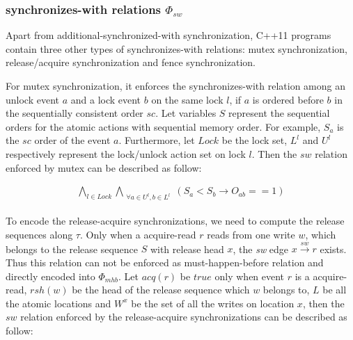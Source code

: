 \documentclass[preprint, numbers, 10pt]{sigplanconf}
\begin{document}
\subsubsection{synchronizes-with relations $\Phi_{sw}$}

Apart from additional-synchronized-with synchronization, C++11 programs 
contain three other types of synchronizes-with relations: 
mutex synchronization, release/acquire synchronization and fence synchronization. 

For mutex synchronization, it enforces the synchronizes-with relation among an unlock event $a$
and a lock event $b$ on the same lock $l$, if $a$ is ordered before $b$ in the sequentially consistent 
order $sc$.  Let variables $S$ represent the sequential orders for the atomic actions with sequential
memory order. For example, $S_a$ is the $sc$ order of the event $a$. Furthermore, 
let $Lock$ be the lock set, $L^l$ and $U^l$ respectively represent the lock/unlock action set on lock $l$. 
Then the $sw$ relation enforced by mutex can be described as follow: 

\begin{equation}
\begin{aligned}
\bigwedge_{l\in Lock} \bigwedge_{\substack{\forall a\in U^l, b\in L^l}}(S_a<S_b\rightarrow O_{ab}==1)
\end{aligned}
\end{equation}


To encode the release-acquire synchronizations, we need to compute the release sequences
along $\tau$. %
Only when a acquire-read $r$ reads from one write $w$,
which belongs to the release sequence $S$ with release head $x$, the \textit{sw} edge 
$x \stackrel{sw}{\longrightarrow} r$ exists. Thus this relation can not be enforced 
as must-happen-before relation and directly encoded into $\Phi_{mhb}$. 
Let $acq(r)$ be $true$ only when event $r$ is a acquire-read,
$rsh(w)$ be the head of the release sequence which $w$ belongs to, 
$L$ be all the atomic locations and $W^x$ be the set of all the writes on location $x$,
then the $sw$ relation enforced by the release-acquire synchronizations can be described as follow: 
\end{document}
